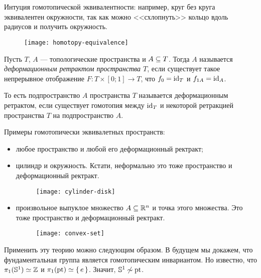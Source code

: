 \documentclass[main]{subfiles}
\begin{document}
\resetcounters

\section{}

Интуция гомотопической эквивалентности: например, круг без круга эквивалентен окружности, так как можно
<<схлопнуть>> кольцо вдоль радиусов и получить окружность.

\begin{figure}[H]
	\centering \texttt{[image: homotopy-equivalence]}
\end{figure}

\begin{definition}
	Пусть $ T $, $ A $ --- топологические пространства и $ A \subseteq T $. Тогда $ A $ называется \emph{деформационным
	ретрактом пространства $ T $}, если существует такое непрерывное отображение $ F \colon T \times [0; 1] \to T $,
	что $ f_0 = \operatorname{id}_T $ и $ f_{1 A} = \operatorname{id}_A $.
\end{definition}

\begin{remark}
	То есть подпространство $ A $ пространства $ T $ называется деформационным ретрактом, если существует гомотопия
	между $ \operatorname{id}_T $ и некоторой ретракцией пространства $ T $ на подпространство $ A $.
\end{remark}

\begin{example} Примеры гомотопически эквивалетных пространств:
	\begin{itemize}
		\item любое пространство и любой его деформационный ректракт;
		\item цилиндр и окружность. Кстати, неформально это тоже пространство и деформационный ректракт.
			\begin{figure}[H]
				\centering \texttt{[image: cylinder-disk]}
			\end{figure}
		\item произвольное выпуклое множество $ A \subseteq \mathbb{R}^n $ и точка этого множества. Это тоже пространство и
			деформационный ректракт.
			\begin{figure}[H]
				\centering \texttt{[image: convex-set]}
			\end{figure}
	\end{itemize}
\end{example}

\begin{example}
	Применить эту теорию можно следующим образом. В будущем мы докажем, что фундаментальная группа является
	гомотопическим инвариантом. Но известно, что $ \pi_1(\mathbb{S}^1) \simeq \mathbb{Z} $ и $ \pi_1(\operatorname{pt}) \simeq \left\{\,e\,\right\} $.
	Значит, $ \mathbb{S}^1 \not \sim \operatorname{pt} $.
\end{example}
\end{document}
